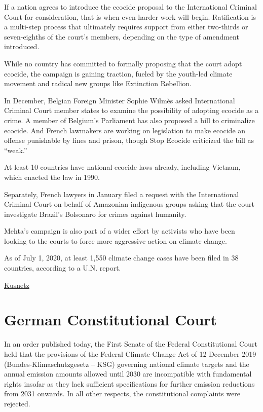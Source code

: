 \documentclass[
]{book}
\begin{document}
If a nation agrees to introduce the ecocide proposal to the International Criminal Court for consideration, that is when even harder work will begin. Ratification is a multi-step process that ultimately requires support from either two-thirds or seven-eighths of the court's members, depending on the type of amendment introduced.

While no country has committed to formally proposing that the court adopt ecocide, the campaign is gaining traction, fueled by the youth-led climate movement and radical new groups like Extinction Rebellion.

In December, Belgian Foreign Minister Sophie Wilmès asked International Criminal Court member states to examine the possibility of adopting ecocide as a crime. A member of Belgium's Parliament has also proposed a bill to criminalize ecocide. And French lawmakers are working on legislation to make ecocide an offense punishable by fines and prison, though Stop Ecocide criticized the bill as ``weak.''

At least 10 countries have national ecocide laws already, including Vietnam, which enacted the law in 1990.

Separately, French lawyers in January filed a request with the International Criminal Court on behalf of Amazonian indigenous groups asking that the court investigate Brazil's Bolsonaro for crimes against humanity.

Mehta's campaign is also part of a wider effort by activists who have been looking to the courts to force more aggressive action on climate change.

As of July 1, 2020, at least 1,550 climate change cases have been filed in 38 countries, according to a U.N. report.

\href{https://insideclimatenews.org/news/07042021/climate-crisis-ecocide-vanuatu-the-fifth-crime/}{Kusnetz}

\hypertarget{german-constitutional-court}{%
\section{German Constitutional Court}\label{german-constitutional-court}}

In an order published today, the First Senate of the Federal Constitutional Court held that the provisions of the Federal Climate Change Act of 12 December 2019 (Bundes-Klimaschutzgesetz -- KSG) governing national climate targets and the annual emission amounts allowed until 2030 are incompatible with fundamental rights insofar as they lack sufficient specifications for further emission reductions from 2031 onwards. In all other respects, the constitutional complaints were rejected.
\end{document}
